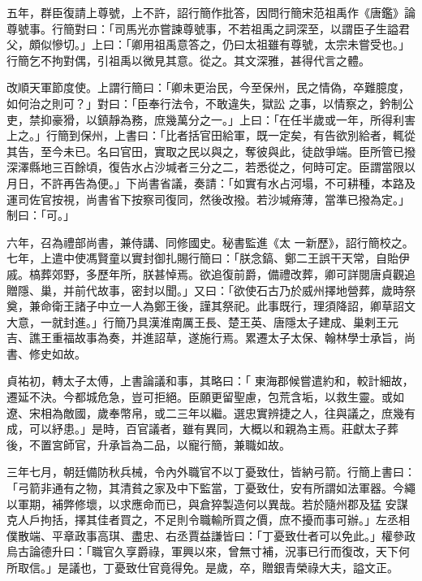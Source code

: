 \begin{pinyinscope}
 五年，群臣復請上尊號，上不許，詔行簡作批答，因問行簡宋范祖禹作《唐鑑》論尊號事。行簡對曰：「司馬光亦嘗諫尊號事，不若祖禹之詞深至，以謂臣子生謚君父，頗似慘切。」上曰：「卿用祖禹意答之，仍曰太祖雖有尊號，太宗未嘗受也。」行簡乞不拘對偶，引祖禹以微見其意。從之。其文深雅，甚得代言之體。



 改順天軍節度使。上謂行簡曰：「卿未更治民，今至保州，民之情偽，卒難臆度，如何治之則可？」對曰：「臣奉行法令，不敢違失，獄訟
 之事，以情察之，鈐制公吏，禁抑豪猾，以鎮靜為務，庶幾萬分之一。」上曰：「在任半歲或一年，所得利害上之。」行簡到保州，上書曰：「比者括官田給軍，既一定矣，有告欲別給者，輒從其告，至今未已。名曰官田，實取之民以與之，奪彼與此，徒啟爭端。臣所管已撥深澤縣地三百餘頃，復告水占沙堿者三分之二，若悉從之，何時可定。臣謂當限以月日，不許再告為便。」下尚書省議，奏請：「如實有水占河塌，不可耕種，本路及運司佐官按視，尚書省下按察司復同，然後改撥。若沙堿瘠薄，當準已撥為定。」制曰：「可。」



 六年，召為禮部尚書，兼侍講、同修國史。秘書監進《太
 一新歷》，詔行簡校之。七年，上遣中使馮賢童以實封御扎賜行簡曰：「朕念鎬、鄭二王誤干天常，自貽伊戚。槁葬郊野，多歷年所，朕甚悼焉。欲追復前爵，備禮改葬，卿可詳閱唐貞觀追贈隱、巢，并前代故事，密封以聞。」又曰：「欲使石古乃於威州擇地營葬，歲時祭奠，兼命衛王諸子中立一人為鄭王後，謹其祭祀。此事既行，理須降詔，卿草詔文大意，一就封進。」行簡乃具漢淮南厲王長、楚王英、唐隱太子建成、巢剌王元吉、譙王重福故事為奏，并進詔草，遂施行焉。累遷太子太保、翰林學士承旨，尚書、修史如故。



 貞祐初，轉太子太傅，上書論議和事，其略曰：「
 東海郡候嘗遣約和，較計細故，遷延不決。今都城危急，豈可拒絕。臣願更留聖慮，包荒含垢，以救生靈。或如遼、宋相為敵國，歲奉幣帛，或二三年以繼。選忠實辨捷之人，往與議之，庶幾有成，可以紓患。」是時，百官議者，雖有異同，大概以和親為主焉。莊獻太子葬後，不置宮師官，升承旨為二品，以寵行簡，兼職如故。



 三年七月，朝廷備防秋兵械，令內外職官不以丁憂致仕，皆納弓箭。行簡上書曰：「弓箭非通有之物，其清貧之家及中下監當，丁憂致仕，安有所謂如法軍器。今繩以軍期，補弊修壞，以求應命而已，與倉猝製造何以異哉。若於隨州郡及猛
 安謀克人戶拘括，擇其佳者買之，不足則令職輸所買之價，庶不擾而事可辦。」左丞相僕散端、平章政事高琪、盡忠、右丞賈益謙皆曰：「丁憂致仕者可以免此。」權參政烏古論德升曰：「職官久享爵祿，軍興以來，曾無寸補，況事已行而復改，天下何所取信。」是議也，丁憂致仕官竟得免。是歲，卒，贈銀青榮祿大夫，謚文正。




\end{pinyinscope}
